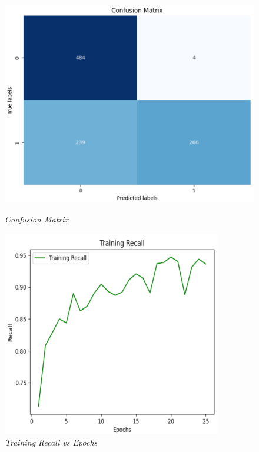 \documentclass[12pt, a4paper]{report}
\begin{document}
\begin{figure}[htbp]
    \centering
    \begin{minipage}{0.4\textwidth}
        \centering
        \includegraphics[width=\linewidth]{report images/image11.png}
        \caption{\textit{Confusion Matrix}}
    \end{minipage}%
    \hspace{0.05\textwidth} %
    \begin{minipage}{0.4\textwidth}
        \centering
        \includegraphics[width=\linewidth]{report images/image12.png}
        \caption{\textit{Training Recall vs Epochs}}
    \end{minipage}
\end{figure}
\end{document}
